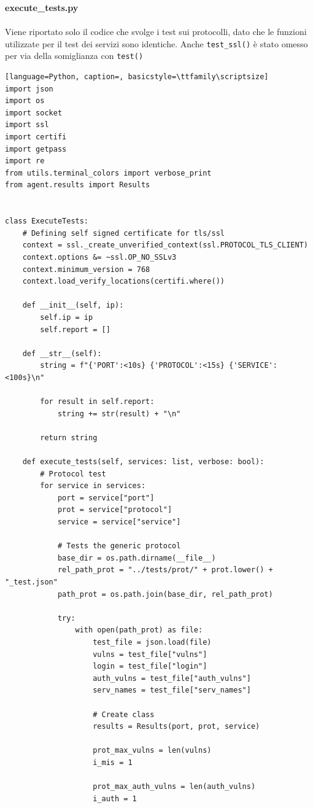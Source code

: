 \documentclass[12pt]{report}
\begin{document}
\noindent
\textbf{execute\_tests.py}
\\\\
Viene riportato solo il codice che svolge i test sui protocolli, dato che le funzioni utilizzate per il test dei servizi sono identiche. Anche \lstinline{test_ssl()} è stato omesso per via della somiglianza con \lstinline{test()} 
\begin{lstlisting}[language=Python, caption=, basicstyle=\ttfamily\scriptsize]
import json
import os
import socket
import ssl
import certifi
import getpass
import re
from utils.terminal_colors import verbose_print
from agent.results import Results


class ExecuteTests:
    # Defining self signed certificate for tls/ssl
    context = ssl._create_unverified_context(ssl.PROTOCOL_TLS_CLIENT)
    context.options &= ~ssl.OP_NO_SSLv3
    context.minimum_version = 768
    context.load_verify_locations(certifi.where())

    def __init__(self, ip):
        self.ip = ip
        self.report = []

    def __str__(self):
        string = f"{'PORT':<10s} {'PROTOCOL':<15s} {'SERVICE':<100s}\n"

        for result in self.report:
            string += str(result) + "\n"

        return string

    def execute_tests(self, services: list, verbose: bool):
        # Protocol test
        for service in services:
            port = service["port"]
            prot = service["protocol"]
            service = service["service"]

            # Tests the generic protocol
            base_dir = os.path.dirname(__file__)
            rel_path_prot = "../tests/prot/" + prot.lower() + "_test.json"
            path_prot = os.path.join(base_dir, rel_path_prot)

            try:
                with open(path_prot) as file:
                    test_file = json.load(file)
                    vulns = test_file["vulns"]
                    login = test_file["login"]
                    auth_vulns = test_file["auth_vulns"]
                    serv_names = test_file["serv_names"]

                    # Create class
                    results = Results(port, prot, service)

                    prot_max_vulns = len(vulns)
                    i_mis = 1

                    prot_max_auth_vulns = len(auth_vulns)
                    i_auth = 1


\end{lstlisting}
\end{document}
